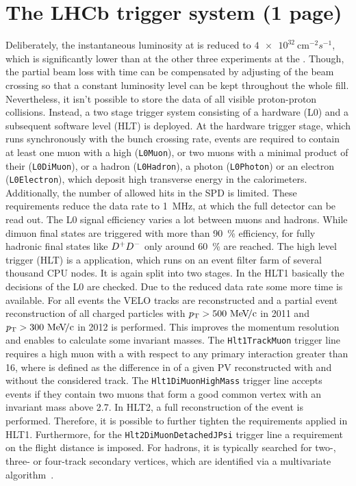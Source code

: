 
\section{The LHCb trigger system (1 page)}
\label{sec:detector:trigger}

Deliberately, the instantaneous luminosity at \lhcb is reduced to
$\SI{4e32}{\cm^{-2}s^{-1}}$, which is significantly lower than at the other
three experiments at the \lhc. Though, the partial beam loss with time can be
compensated by adjusting of the beam crossing so that a constant luminosity
level can be kept throughout the whole fill. Nevertheless, it isn't possible
to store the data of all visible proton-proton collisions. Instead, a two
stage trigger system consisting of a hardware (L0) and a subsequent software
level (HLT) is deployed. At the hardware trigger stage, which runs
synchronously with the bunch crossing rate, events are required to contain at
least one muon with a high \pt (\texttt{L0Muon}), or two muons with a minimal
product of their \pT (\texttt{L0DiMuon}), or a hadron (\texttt{L0Hadron}), a
photon (\texttt{L0Photon}) or an electron (\texttt{L0Electron}), which deposit
high transverse energy in the calorimeters. Additionally, the number of
allowed hits in the SPD is limited. These requirements reduce the data rate to 
\SI{1}{\mega\hertz}, at which the full detector can be read out. The L0 signal
efficiency varies a lot between muons and hadrons. While dimuon final states
are triggered with more than \SI{90}{\percent} efficiency, for fully hadronic
final states like ${{D}^+}{{D}^-}$ only around \SI{60}{\percent} are reached. The high
level trigger (HLT) is a \cpp application, which runs on an event filter farm
of several thousand CPU nodes. It is again split into two stages. In the HLT1
basically the decisions of the L0 are checked. Due to the reduced data rate
some more time is available. For all events the VELO tracks are reconstructed
and a partial event reconstruction of all charged particles with $\mbox{$p_{\mathrm{ T}}$} >
\SI{500}{\ensuremath{{\mathrm{\,Me\kern -0.1em V\!/}c}}}$ in 2011 and $\mbox{$p_{\mathrm{ T}}$} > \SI{300}{\ensuremath{{\mathrm{\,Me\kern -0.1em V\!/}c}}}$ in 2012 is performed.
This improves the momentum resolution and enables to calculate some invariant
masses. The \texttt{Hlt1TrackMuon} trigger line requires a high \pt muon with
a \chisqip with respect to any primary interaction greater than 16, where
\chisqip is defined as the difference in \chisq of a given PV reconstructed
with and without the considered track.
The \texttt{Hlt1DiMuonHighMass} trigger line accepts events if they contain
two muons that form a good common vertex with an invariant mass above
\SI{2.7}{\gevcc}. In HLT2, a full reconstruction of the event is performed.
Therefore, it is possible to further tighten the requirements applied in HLT1.
Furthermore, for the \texttt{Hlt2DiMuonDetachedJPsi} trigger line a
requirement on the flight distance is imposed. For hadrons, it is typically
searched for two-, three- or four-track secondary vertices, which are
identified via a multivariate algorithm~\cite{BBDT}.

